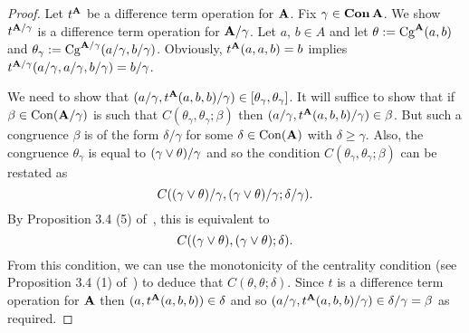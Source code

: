\documentclass{ws-ijac}
\begin{document}
\begin{proof}
  Let $t^{\mathbf{A}}$ be a difference term operation for $\mathbf{A}$.  Fix $\gamma \in \operatorname{\mathbf{Con}} \mathbf{A}$.
We show $t^{\mathbf{A}/\gamma}$ is a difference term operation for $\mathbf{A}/\gamma$.  Let $a$, $b \in A$ and let $\theta:= \operatorname{Cg}^{\mathbf{A}}(a,b)$ and $\theta_\gamma := \operatorname{Cg}^{\mathbf{A}/\gamma}(a/\gamma, b/\gamma)$.
Obviously, $t^{\mathbf{A}}(a,a,b) = b$  implies
$t^{\mathbf{A}/\gamma}(a/\gamma, a/\gamma, b/\gamma) = b/\gamma$.

We need to show that $(a/\gamma, t^{\mathbf{A}}(a,b,b)/\gamma) \in [\theta_\gamma, \theta_\gamma]$.  It will suffice to show that if $\beta \in \operatorname{Con}(\mathbf{A}/\gamma)$  is such that $C(\theta_\gamma, \theta_\gamma; \beta)$ then $(a/\gamma, t^{\mathbf{A}}(a,b,b)/\gamma) \in \beta$.  But such a congruence $\beta$ is of the form $\delta/\gamma$ for some $\delta \in \operatorname{Con}(\mathbf{A})$ with $\delta \ge \gamma$. Also, the congruence $\theta_\gamma$ is equal to $(\gamma \join \theta)/\gamma$ and so the condition $C(\theta_\gamma, \theta_\gamma; \beta)$ can be restated as
\[
C((\gamma \join \theta)/\gamma, (\gamma \join \theta)/\gamma; \delta/\gamma).
\]
By Proposition 3.4 (5) of~\cite{HM:1988}, this is equivalent to
\[
C((\gamma \join \theta), (\gamma \join \theta); \delta).
\]
From this condition, we can use the monotonicity of the centrality condition (see Proposition 3.4 (1) of~\cite{HM:1988}) to deduce that $C(\theta, \theta; \delta)$. Since $t$ is a difference term operation for $\mathbf{A}$ then $(a, t^{\mathbf{A}}(a,b,b)) \in \delta$ and so $(a/\gamma, t^{\mathbf{A}}(a,b,b)/\gamma) \in  \delta/\gamma = \beta$ as required.
\end{proof}
%
%
%
\end{document}
